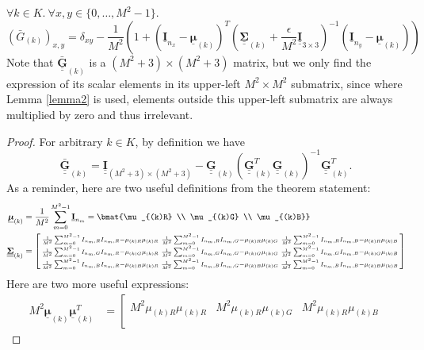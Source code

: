 \documentclass{article}
\def\vt#1{\underline{\mathbf{#1}}}
\def\vts#1{\underline{\boldsymbol{#1}}}
\def\mt#1{\underline{\underline{\mathbf{#1}}}}
\def\mts#1{\underline{\underline{\boldsymbol{#1}}}}
\begin{document}
\begin{lemma}\label{lemma2}
    $\forall k\in K.\ \forall x,y\in\{0,\dots, M^2-1\}.$
    $$\left({\bar{G}}_{(k)}\right)_{x,y} = \delta_{xy} - \frac1{M^2}\left(1 + \left(\vt{I}_{n_x} - \vts \mu_{(k)}\right)^T \left(\mts \Sigma_{(k)} + \frac\epsilon{M^2} \mt{I}_{3\times 3}\right)^{-1} \left(\vt{I}_{n_y} - \vts \mu_{(k)}\right) \right)$$
    Note that $\mt{\bar{G}}_{(k)}$ is a $(M^2+3)\times (M^2+3)$ matrix, but we only find the expression of its scalar elements in its upper-left $M^2\times M^2$ submatrix, since where Lemma \ref{lemma2} is used, elements outside this upper-left submatrix are always multiplied by zero and thus irrelevant.
    \begin{proof}
        For arbitrary $k \in K$, by definition we have
        $$\mt{\bar{G}}_{(k)} = \mt I_{(M^2+3)\times(M^2+3)} - \mt G_{(k)}\left(\mt G_{(k)}^T \mt G_{(k)} \right)^{-1} \mt G_{(k)}^T.$$
        As a reminder, here are two useful definitions from the theorem statement:
        \begin{align*}
            \vts \mu_{(k)} &= \frac1{M^2} \sum_{m=0}^{M^2-1} \vt I_{n_m} = \bmat{\mu_{(k)R} \\ \mu_{(k)G} \\ \mu_{(k)B}}\\
            \mts \Sigma_{(k)} &= \left[\begin{smallmatrix}
                \frac1{M^2} \sum_{m=0}^{M^2-1} I_{n_m,R}I_{n_m,R} - \mu_{(k)R}\mu_{(k)R} & \frac1{M^2} \sum_{m=0}^{M^2-1} I_{n_m,R}I_{n_m,G} - \mu_{(k)R}\mu_{(k)G} & \frac1{M^2} \sum_{m=0}^{M^2-1} I_{n_m,R}I_{n_m,B} - \mu_{(k)R}\mu_{(k)B}\\
                \frac1{M^2} \sum_{m=0}^{M^2-1} I_{n_m,G}I_{n_m,R} - \mu_{(k)G}\mu_{(k)R} & \frac1{M^2} \sum_{m=0}^{M^2-1} I_{n_m,G}I_{n_m,G} - \mu_{(k)G}\mu_{(k)G} & \frac1{M^2} \sum_{m=0}^{M^2-1} I_{n_m,G}I_{n_m,B} - \mu_{(k)G}\mu_{(k)B}\\
                \frac1{M^2} \sum_{m=0}^{M^2-1} I_{n_m,B}I_{n_m,R} - \mu_{(k)B}\mu_{(k)R} & \frac1{M^2} \sum_{m=0}^{M^2-1} I_{n_m,B}I_{n_m,G} - \mu_{(k)B}\mu_{(k)G} & \frac1{M^2} \sum_{m=0}^{M^2-1} I_{n_m,B}I_{n_m,B} - \mu_{(k)B}\mu_{(k)B}
           \end{smallmatrix}\right]
        \end{align*}
        Here are two more useful expressions:
        \begin{align*}
            M^2 \vts\mu_{(k)}\vts\mu_{(k)}^T &= \left[\begin{smallmatrix}
                M^2 \mu_{(k)R}\mu_{(k)R} & M^2 \mu_{(k)R}\mu_{(k)G} & M^2 \mu_{(k)R}\mu_{(k)B} \\

\end{smallmatrix}
\end{align*}
\end{proof}
\end{lemma}
\end{document}
